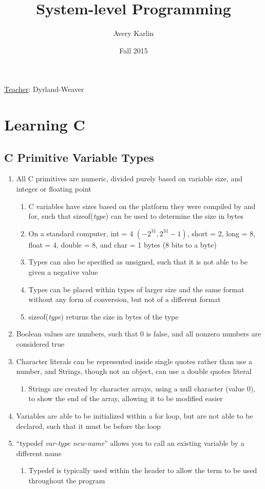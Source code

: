 \documentclass[11 pt, twoside]{article}
\begin{document}
\title{System-level Programming}
\author{Avery Karlin}
\date{Fall 2015}

\maketitle
\newpage
\hypertarget{content}{\tableofcontents}
\vspace{11pt}
\noindent
\underline{Teacher}: Dyrland-Weaver
\newpage

\section{Learning C}
\subsection{C Primitive Variable Types}
\begin{enumerate}
\item All C primitives are numeric, divided purely based on variable size, and integer or floating point
\begin{enumerate}
\item C variables have sizes based on the platform they were compiled by and for, such that sizeof(\textit{type}) can be used to determine the size in bytes
\item On a standard computer, int = 4 $(-2^31, 2^31 - 1)$, short = 2, long = 8, float = 4, double = 8, and char = 1 bytes (8 bits to a byte)
\item Types can also be specified as unsigned, such that it is not able to be given a negative value
\item Types can be placed within types of larger size and the same format without any form of conversion, but not of a different format
\item sizeof(\textit{type}) returns the size in bytes of the type
\end{enumerate}
\item Boolean values are numbers, such that 0 is false, and all nonzero numbers are considered true
\item Character literals can be represented inside single quotes rather than use a number, and Strings, though not an object, can use a double quotes literal
\begin{enumerate}
\item Strings are created by character arrays, using a null character (value 0), to show the end of the array, allowing it to be modified easier
\end{enumerate}
\item Variables are able to be initialized within a for loop, but are not able to be declared, such that it must be before the loop
\item ``typedef \textit{var-type} \textit{new-name}'' allows you to call an existing variable by a different name
\begin{enumerate}
\item Typedef is typically used within the header to allow the term to be used throughout the program
\end{enumerate}
\end{enumerate}
\end{document}

